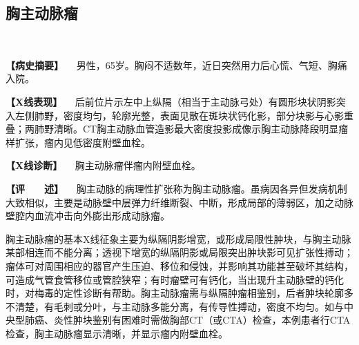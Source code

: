 \subsection{胸主动脉瘤}

\begin{figure}
  \centering
{}
\\
\caption{}
\label{fig4-9-2}
\end{figure}

\textbf{【病史摘要】}
　男性，65岁。胸闷不适数年，近日突然用力后心慌、气短、胸痛入院。

\textbf{【X线表现】}
　后前位片示左中上纵隔（相当于主动脉弓处）有圆形块状阴影突入左侧肺野，密度均匀，轮廓光整，表面见散在斑块状钙化影，部分块影与心影重叠；两肺野清晰。CT胸主动脉血管造影最大密度投影成像示胸主动脉降段明显瘤样扩张，瘤内见低密度附壁血栓。

\textbf{【X线诊断】} 　胸主动脉瘤伴瘤内附壁血栓。

\textbf{【评　　述】}
　胸主动脉的病理性扩张称为胸主动脉瘤。虽病因各异但发病机制大致相似，主要是动脉壁中层弹力纤维断裂、中断，形成局部的薄弱区，加之动脉壁腔内血流冲击向外膨出形成动脉瘤。

胸主动脉瘤的基本X线征象主要为纵隔阴影增宽，或形成局限性肿块，与胸主动脉某部相连而不能分离；透视下增宽的纵隔阴影或局限突出肿块影可见扩张性搏动；瘤体可对周围相应的器官产生压迫、移位和侵蚀，并影响其功能甚至破坏其结构，可造成气管食管移位或管腔狭窄；有时瘤壁可有钙化，当出现升主动脉壁的钙化时，对梅毒的定性诊断有帮助。胸主动脉瘤需与纵隔肿瘤相鉴别，后者肿块轮廓多不清楚，有毛刺或分叶，与主动脉多能分离，有传导性搏动，密度不均匀。如与中央型肺癌、炎性肿块鉴别有困难时需做胸部CT（或CTA）检查，本例患者行CTA检查，胸主动脉瘤显示清晰，并显示瘤内附壁血栓。

\protect\hypertarget{text00010.html}{}{}

